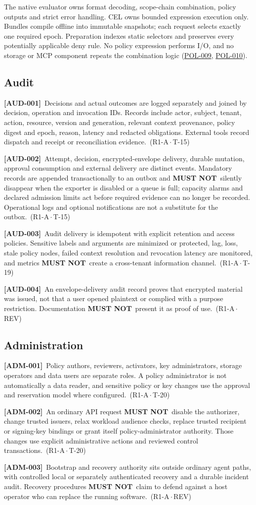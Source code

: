 \documentclass[11pt,a4paper]{article}
\newcommand{\mustnot}{\textbf{MUST NOT}}
\newcommand{\rr}[1]{\hyperlink{req:#1}{#1}}
\newcommand{\reqtag}[2]{{\footnotesize\color{accent}(#1\,$\cdot$\,#2)}}
\newcommand{\req}[4]{\par\noindent\hypertarget{req:#1}{\textbf{[#1]}}\ #4\ \reqtag{#2}{#3}\par}
\begin{document}
The native evaluator owns format decoding, scope-chain combination, policy outputs and strict error handling. CEL owns bounded expression execution only. Bundles compile offline into immutable snapshots; each request selects exactly one required epoch. Preparation indexes static selectors and preserves every potentially applicable deny rule. No policy expression performs I/O, and no storage or MCP component repeats the combination logic (\rr{POL-009}, \rr{POL-010}).

\subsection{Audit}
\req{AUD-001}{R1-A}{T-15}{Decisions and actual outcomes are logged separately and joined by decision, operation and invocation IDs. Records include actor, subject, tenant, action, resource, version and generation, relevant context provenance, policy digest and epoch, reason, latency and redacted obligations. External tools record dispatch and receipt or reconciliation evidence.}
\req{AUD-002}{R1-A}{T-15}{Attempt, decision, encrypted-envelope delivery, durable mutation, approval consumption and external delivery are distinct events. Mandatory records are appended transactionally to an outbox and \mustnot\ silently disappear when the exporter is disabled or a queue is full; capacity alarms and declared admission limits act before required evidence can no longer be recorded. Operational logs and optional notifications are not a substitute for the outbox.}
\req{AUD-003}{R1-A}{T-19}{Audit delivery is idempotent with explicit retention and access policies. Sensitive labels and arguments are minimized or protected, lag, loss, stale policy nodes, failed context resolution and revocation latency are monitored, and metrics \mustnot\ create a cross-tenant information channel.}
\req{AUD-004}{R1-A}{REV}{An envelope-delivery audit record proves that encrypted material was issued, not that a user opened plaintext or complied with a purpose restriction. Documentation \mustnot\ present it as proof of use.}

\subsection{Administration}
\req{ADM-001}{R1-A}{T-20}{Policy authors, reviewers, activators, key administrators, storage operators and data users are separate roles. A policy administrator is not automatically a data reader, and sensitive policy or key changes use the approval and reservation model where configured.}
\req{ADM-002}{R1-A}{T-20}{An ordinary API request \mustnot\ disable the authorizer, change trusted issuers, relax workload audience checks, replace trusted recipient or signing-key bindings or grant itself policy-administrator authority. Those changes use explicit administrative actions and reviewed control transactions.}
\req{ADM-003}{R1-A}{REV}{Bootstrap and recovery authority sits outside ordinary agent paths, with controlled local or separately authenticated recovery and a durable incident audit. Recovery procedures \mustnot\ claim to defend against a host operator who can replace the running software.}
\end{document}
